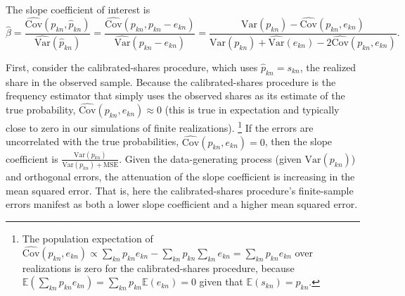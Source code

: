 \documentclass[11pt]{article}
\theoremstyle{definition}
\begin{document}
The slope coefficient of interest is
\begin{equation*}
\hat{\beta}
=
\frac{\widehat{\text{Cov}}(p_{kn},\hat{p}_{kn})}{\widehat{\text{Var}}(\hat{p}_{kn})}
=
\frac{\widehat{\text{Cov}}(p_{kn},p_{kn} - e_{kn})}{\widehat{\text{Var}}(p_{kn} - e_{kn})}
=
\frac{\text{Var}(p_{kn}) - \widehat{\text{Cov}}(p_{kn},e_{kn})}{\text{Var}(p_{kn}) + \widehat{\text{Var}}(e_{kn}) - 2\widehat{\text{Cov}}(p_{kn},e_{kn})}
.\end{equation*}

First, consider the calibrated-shares procedure,
which uses $\hat{p}_{kn} = s_{kn}$, the realized share in the observed sample.
Because the calibrated-shares procedure is the frequency estimator that simply uses the observed shares as its estimate of the true probability,
$\widehat{\text{Cov}}(p_{kn},e_{kn}) \approx 0$ (this is true in expectation and typically close to zero in our simulations of finite realizations).%
\footnote{
	The population expectation of $\widehat{\text{Cov}}(p_{kn},e_{kn}) \propto \sum_{kn} p_{kn} e_{kn} - \sum_{kn}p_{kn} \sum_{kn}e_{kn} = \sum_{kn} p_{kn} e_{kn}$ over realizations is zero for the calibrated-shares procedure,
	because $\mathbb{E}\left(\sum_{kn} p_{kn} e_{kn}\right) = \sum_{kn} p_{kn} \mathbb{E}\left(e_{kn}\right) = 0$ given that $\mathbb{E}(s_{kn}) = p_{kn}$.
}
If the errors are uncorrelated with the true probabilities, 
$\widehat{\text{Cov}}(p_{kn},e_{kn}) = 0$,
then the slope coefficient is
$\frac{\text{Var}(p_{kn})}{\text{Var}(p_{kn}) + \text{MSE}}$.
Given the data-generating process (given $\text{Var}(p_{kn})$) and orthogonal errors,
the attenuation of the slope coefficient is increasing in the mean squared error.
That is, here the calibrated-shares procedure's finite-sample errors manifest as both a lower slope coefficient and a higher mean squared error.
\end{document}
